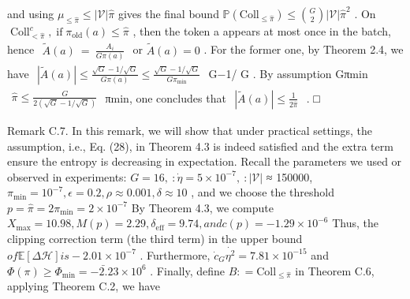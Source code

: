 \documentclass[
  10
]{article}
\begin{document}
and using
\(\mu _ { \leq \hat { \pi } } \leq | \mathcal { V } | \hat { \pi }\)
gives the final bound
\(\mathbb { P } ( \mathrm { C o l l } _ { \leq \hat { \pi } } ) \le \binom { G } { 2 } | \mathcal { V } | \hat { \pi } ^ { 2 }\)
. On
\(\operatorname { C o l l } _ { < \hat { \pi } } ^ { c } , \operatorname { i f } \pi _ { \mathrm { o l d } } ( a ) \le \hat { \pi }\)
, then the token a appears at most once in the batch, hence
\(\begin{array} { r } { \tilde { A } ( { a } ) ~ = ~ \frac { A _ { i } } { G \pi ( { a } ) } } \end{array}\)
or \(\tilde { A } ( a ) = 0\) . For the former one, by Theorem 2.4, we
have
\(\begin{array} { r } { | \tilde { A } ( a ) | \le \frac { \sqrt { G } - 1 / \sqrt { G } } { G \pi ( a ) } \le \frac { \sqrt { G } - 1 / \sqrt { G } } { G \pi _ { \operatorname* { m i n } } } } \end{array}\)
G−1/ G . By assumption Gπmin
\(\begin{array} { r } { \hat { \pi } \leq \frac { G } { 2 ( \sqrt { G } - 1 / \sqrt { G } ) } } \end{array}\)
πmin, one concludes that
\(\begin{array} { r } { | \tilde { A } ( a ) | \le \frac { 1 } { 2 \hat { \pi } } } \end{array}\)
. □

Remark C.7. In this remark, we will show that under practical settings,
the assumption, i.e., Eq. (28), in Theorem 4.3 is indeed satisfied and
the extra term ensure the entropy is decreasing in expectation. Recall
the parameters we used or observed in experiments:
\(G = 1 6 , \ : \dot { \eta } = 5 \times 1 0 ^ { - 7 } , \ : | \mathcal { V } |\)
≈ 150000,
\(\pi _ { \mathrm { m i n } } = 1 0 ^ { - 7 } , \epsilon = 0 . 2 , \rho \approx 0 . 0 0 1 , \delta \approx 1 0\)
, and we choose the threshold
\(p = \hat { \pi } = 2 \pi _ { \mathrm { m i n } } = 2 \times 1 0 ^ { - 7 }\)
By Theorem 4.3, we compute
\(X _ { \mathrm { m a x } } = 1 0 . 9 8 , M ( p ) = 2 . 2 9 , \delta _ { \mathrm { e f f } } = 9 . 7 4 , a n d c ( p ) = - 1 . 2 9 \times 1 0 ^ { - 6 }\)
Thus, the clipping correction term (the third term) in the upper bound
\(o f \mathbb { E } [ \Delta \mathcal { H } ] i s - 2 . 0 1 \times 1 0 ^ { - 7 }\)
. Furthermore,
\(\dot { c } _ { G } \dot { \eta ^ { 2 } } = 7 . 8 1 \times 1 0 ^ { - 1 5 }\)
and
\(\Phi ( \pi ) \ge \Phi _ { \mathrm { m i n } } = - \bar { 2 . } 2 3 \times 1 0 ^ { 6 }\)
. Finally, define \(B : = \mathrm { C o l l } _ { \leq \hat { \pi } }\)
in Theorem C.6, applying Theorem C.2, we have
\end{document}
